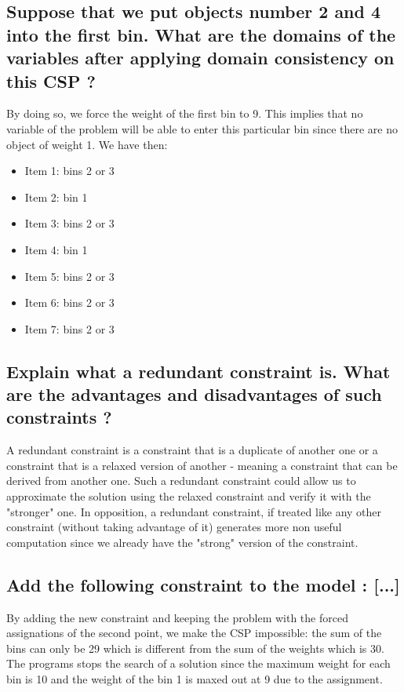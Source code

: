 \documentclass[a4paper ,12pt,french]{article}
\begin{document}
\subsection{Suppose that we put objects number 2 and 4 into the first bin. What are the domains of the variables after applying domain consistency on this CSP ?}
By doing so, we force the weight of the first bin to 9. This implies that no variable of the problem will be able to enter this particular bin since there are no object of weight 1. We have then: \begin{itemize}
\item Item 1: bins 2 or 3
\item Item 2: bin 1
\item Item 3: bins 2 or 3
\item Item 4: bin 1
\item Item 5: bins 2 or 3
\item Item 6: bins 2 or 3
\item Item 7: bins 2 or 3

\end{itemize}
\subsection{Explain what a redundant constraint is. What are the advantages and disadvantages of such constraints ?}
A redundant constraint is a constraint that is a duplicate of another one or a constraint that is a relaxed version of another - meaning a constraint that can be derived from another one. Such a redundant constraint could allow us to approximate the solution using the relaxed constraint and verify it with the "stronger" one. In opposition, a redundant constraint, if treated like any other constraint (without taking advantage of it) generates more non useful computation since we already have the "strong" version of the constraint. 
\subsection{Add the following constraint to the model : [...]}
By adding the new constraint and keeping the problem with the forced assignations of the second point, we make the CSP impossible: the sum of the bins can only be 29 which is different from the sum of the weights which is 30. The programs stops the search of a solution since the maximum weight for each bin is 10 and the weight of the bin 1 is maxed out at 9 due to the assignment. 
\end{document}
